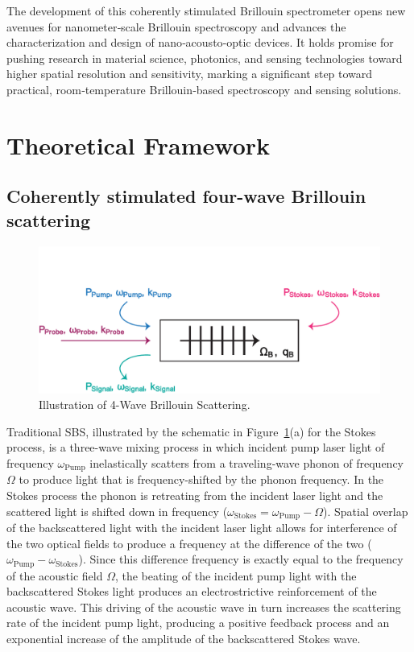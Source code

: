 The development of this coherently stimulated Brillouin spectrometer opens new avenues for nanometer‐scale Brillouin spectroscopy and advances the characterization and design of nano‐acousto‐optic devices. It holds promise for pushing research in material science, photonics, and sensing technologies toward higher spatial resolution and sensitivity, marking a significant step toward practical, room‐temperature Brillouin‐based spectroscopy and sensing solutions.

\section{Theoretical Framework}
\label{Theoretical Framework}

\subsection{Coherently stimulated four-wave Brillouin scattering}
\label{Theoretical Framework:Coherently stimulated five-wave Brillouin scattering}

\begin{figure}[t]
  \centering
  \includegraphics[width=\textwidth]{figs/4-CABS/4-Wave-Brillouin-Scattering.pdf}
  \caption{Illustration of 4-Wave Brillouin Scattering.}
  \label{fig:4-Wave-Brillouin-Scattering}
\end{figure}

Traditional \ac{SBS}, illustrated by the schematic in Figure~\ref{fig:4-Wave-Brillouin-Scattering}(a) for the Stokes process, is a three-wave mixing process in which incident pump laser light of frequency \(\omega_{\mathrm{Pump}}\) inelastically scatters from a traveling-wave phonon of frequency \(\Omega\) to produce light that is frequency-shifted by the phonon frequency. In the Stokes process the phonon is retreating from the incident laser light and the scattered light is shifted down in frequency (\(\omega_{\mathrm{Stokes}} = \omega_{\mathrm{Pump}} - \Omega\)). Spatial overlap of the backscattered light with the incident laser light allows for interference of the two optical fields to produce a frequency at the difference of the two (\(\omega_{\mathrm{Pump}} - \omega_{\mathrm{Stokes}}\)). Since this difference frequency is exactly equal to the frequency of the acoustic field \(\Omega\), the beating of the incident pump light with the backscattered Stokes light produces an electrostrictive reinforcement of the acoustic wave. This driving of the acoustic wave in turn increases the scattering rate of the incident pump light, producing a positive feedback process and an exponential increase of the amplitude of the backscattered Stokes wave.

